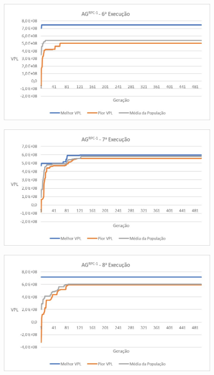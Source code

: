 \documentclass[12pt,a4paper]{report}
\begin{document}
\begin{figure}[H]
\centering

\includegraphics[scale=1]{ApA/AGRPC/6}
\end{figure}

\begin{figure}[H]
\centering

\includegraphics[scale=1]{ApA/AGRPC/7}
\end{figure}

\begin{figure}[H]
\centering

\includegraphics[scale=1]{ApA/AGRPC/8}
\end{figure}
\end{document}
